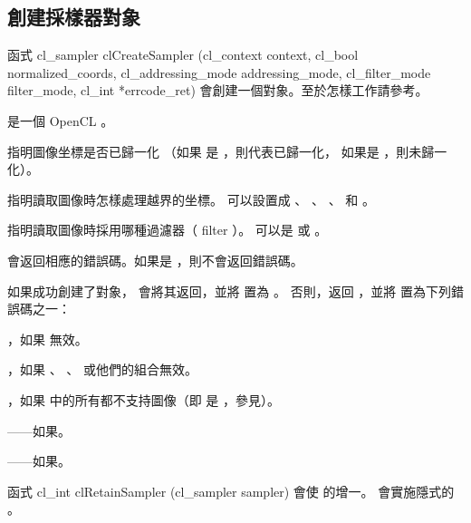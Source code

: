 \subsection{創建採樣器對象}

函式
\startCLFUNC
cl_sampler clCreateSampler (cl_context context,
			cl_bool normalized_coords,
			cl_addressing_mode addressing_mode,
			cl_filter_mode filter_mode,
			cl_int *errcode_ret)
\stopCLFUNC
會創建一個對象。至於怎樣工作請參考。

 是一個 OpenCL 。

 指明圖像坐標是否已歸一化
（如果  是 ，則代表已歸一化，
如果是 ，則未歸一化）。

 指明讀取圖像時怎樣處理越界的坐標。
可以設置成 、 、
 、  和 。

 指明讀取圖像時採用哪種過濾器（ filter ）。
可以是  或 。

 會返回相應的錯誤碼。如果是 ，則不會返回錯誤碼。

如果成功創建了對象，  會將其返回，並將  置為 。
否則，返回 ，並將  置為下列錯誤碼之一：
\startigBase
\item {}，如果  無效。

\item {}，如果 、 、  或他們的組合無效。

\item {}，如果  中的所有都不支持圖像（即  是 ，參見）。

\item {}——如果\scdevfailres。

\item {}——如果\schostfailres。
\stopigBase

函式
\startCLFUNC
cl_int clRetainSampler (cl_sampler sampler)
\stopCLFUNC
會使  的增一。
 會實施隱式的 。

